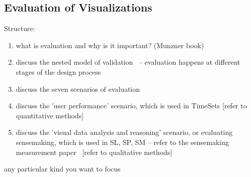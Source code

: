\subsection{Evaluation of Visualizations}
Structure:
\begin{enumerate}
	\item what is evaluation and why is it important? (Munzner book)
	\item discuss the nested model of validation~\cite{Munzner2009} -- evaluation happens at different stages of the design process
	\item discuss the seven scenarios of evaluation ~\cite{Lam2012}
	\item discuss the 'user performance' scenario, which is used in TimeSets [refer to quantitative methods]
	\item discuss the 'visual data analysis and reasoning' scenario, or evaluating sensemaking, which is used in SL, SP, SM -- refer to the sensemaking measurement paper ~\cite{Wilson2013}[refer to qualitative methods]
\end{enumerate}


any particular kind you want to focus 
